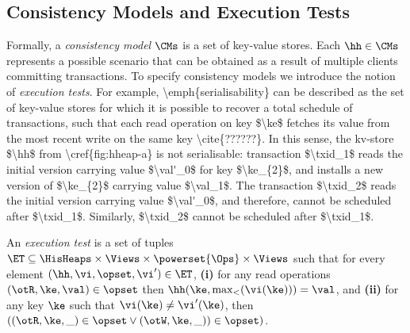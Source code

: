 \subsection{Consistency Models and Execution Tests}

Formally, a \emph{consistency model} $\CMs$ is a set of key-value stores. 
Each $\hh \in \CMs$ represents a possible scenario that 
can be obtained as a result of multiple clients committing transactions. 
To specify consistency models we introduce the notion of \emph{execution tests}. 
\ac{
For example, \emph{serialisability} can be described as the set 
of key-value stores for which it is possible to recover a total schedule of transactions, 
such that each read operation on key $\ke$ fetches its value from the 
most recent write on the same key \cite{??????}.
In this sense, the kv-store $\hh$ from \cref{fig:hheap-a} is not serialisable: 
transaction $\txid_1$ reads the initial version carrying value $\val'_0$ for key $\ke_{2}$, 
and installs a new version of $\ke_{2}$ carrying value $\val_1$. The transaction $\txid_2$ 
reads the initial version carrying value $\val'_0$, and therefore, 
cannot be scheduled after $\txid_1$. Similarly, $\txid_2$ cannot be scheduled after $\txid_1$.
}
\begin{definition}
\label{def:execution.test}
An \emph{execution test} is a set of tuples $\ET \subseteq \HisHeaps \times \Views \times \powerset{\Ops} \times \Views$ 
such that for every element $(\hh, \vi, \opset, \vi') \in \ET$,
\textbf{(i)} for any read operations $(\otR, \ke, \val) \in \opset$ then $\hh(\ke, \max_{<}(\vi(\ke))) = \val$, 
and \textbf{(ii)}  for any key \( \ke \) such that $\vi(\ke) \neq \vi'(\ke)$, 
then $( (\otR, \ke, \_) \in \opset \vee (\otW, \ke, \_)) \in \opset)$.
\end{definition}

